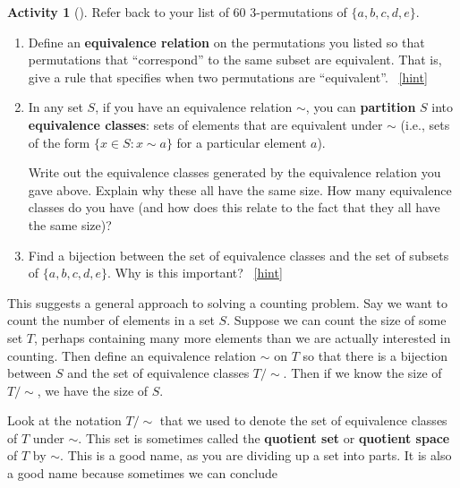 \documentclass[10pt,]{book}
\newcommand{\terminology}[1]{\textbf{#1}}
\theoremstyle{plain}
\theoremstyle{definition}
\theoremstyle{definition}
\theoremstyle{definition}
\newtheorem{activity}[project]{Activity}
\numberwithin{equation}{chapter}
\def\st{:}
\begin{document}
\begin{activity}[]\label{activity-47}
\hypertarget{p-306}{}%
Refer back to your list of 60 3-permutations of \(\{a,b,c,d,e\}\).%
\begin{enumerate}[font=\bfseries,label=(\alph*),ref=\alph*]
\item\label{task-73} \hypertarget{p-307}{}%
Define an \terminology{equivalence relation} on the permutations you listed so that permutations that ``correspond'' to the same subset are equivalent.  That is, give a rule that specifies when two permutations are ``equivalent''.%
~\hfill{\tiny\hyperlink{a-47.a}{[hint]}\hypertarget{q-47.a}{}}\item\label{task-74} \hypertarget{p-309}{}%
In any set \(S\), if you have an equivalence relation \(\sim\), you can \terminology{partition} \(S\) into \terminology{equivalence classes}: sets of elements that are equivalent under \(\sim\) (i.e., sets of the form \(\{x \in S \st x \sim a\} \) for a particular element \(a\)).%
\par
\hypertarget{p-310}{}%
Write out the equivalence classes generated by the equivalence relation you gave above.  Explain why these all have the same size.  How many equivalence classes do you have (and how does this relate to the fact that they all have the same size)?%
\item\label{task-75} \hypertarget{p-311}{}%
Find a bijection between the set of equivalence classes and the set of subsets of \(\{a,b,c,d,e\}\).  Why is this important?%
~\hfill{\tiny\hyperlink{a-47.c}{[hint]}\hypertarget{q-47.c}{}}\end{enumerate}
\end{activity}
\hypertarget{p-313}{}%
This suggests a general approach to solving a counting problem.  Say we want to count the number of elements in a set \(S\).  Suppose we can count the size of some set \(T\), perhaps containing many more elements than we are actually interested in counting.  Then define an equivalence relation \(\sim\) on \(T\) so that there is a bijection between \(S\) and the set of equivalence classes \(T/\sim\).  Then if we know the size of \(T/\sim\), we have the size of \(S\).%
\par
\hypertarget{p-314}{}%
Look at the notation \(T/\sim\) that we used to denote the set of equivalence classes of \(T\) under \(\sim\).  This set is sometimes called the \terminology{quotient set} or \terminology{quotient space} of \(T\) by \(\sim\).  This is a good name, as you are dividing up a set into parts.  It is also a good name because sometimes we can conclude%
\end{document}
